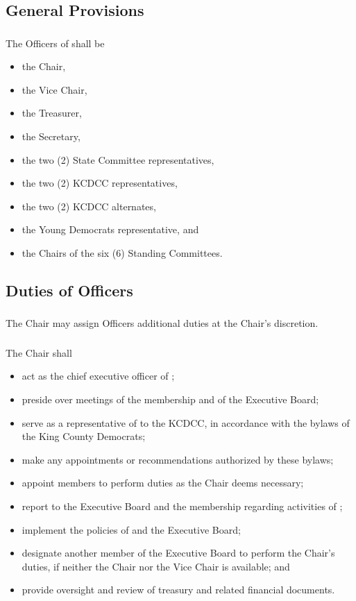 \subsection{General Provisions}
\subsubsection{}
The Officers of \thedistrict{} shall be
\begin{itemize}
    \item the Chair,
    \item the Vice Chair,
    \item the Treasurer,
    \item the Secretary,
    \item the two (2) State Committee representatives,
    \item the two (2) KCDCC representatives,
    \item the two (2) KCDCC alternates,
    \item the Young Democrats representative, and
    \item the Chairs of the six (6) Standing Committees.
\end{itemize}

\subsection{Duties of Officers}
\subsubsection{}
The Chair may assign Officers additional duties at the Chair's discretion.

\subsubsection{}
The Chair shall
\begin{itemize}
    \item act as the chief executive officer of \thedistrict{};
    \item preside over meetings of the membership and of the Executive Board;
    \item serve as a representative of \thedistrict{} to the KCDCC, in accordance with the bylaws of the King County Democrats;
    \item make any appointments or recommendations authorized by these bylaws;
    \item appoint members to perform duties as the Chair deems necessary;
    \item report to the Executive Board and the membership regarding activities of \thedistrict{};
    \item implement the policies of \thedistrict{} and the Executive Board;
    \item designate another member of the Executive Board to perform the Chair’s duties, if neither the Chair nor the Vice Chair is available; and
    \item provide oversight and review of \thedistrict{} treasury and related financial documents.
\end{itemize}

